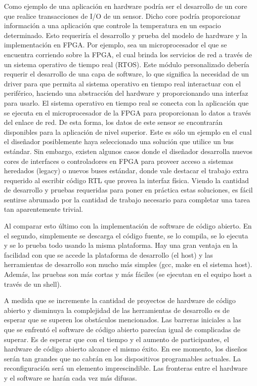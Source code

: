 Como ejemplo de una aplicación en hardware podría ser el desarrollo de
un core que realice transacciones de I/O de un sensor. Dicho core
podría proporcionar información a una aplicación que controle la
temperatura en un espacio determinado. Esto requeriría el desarrollo y
prueba del modelo de hardware y la implementación en FPGA. Por
ejemplo, sea un microprocesador el que se encuentra corriendo sobre la
FPGA, el cual brinda los servicios de red a través de un sistema
operativo de tiempo real (RTOS). Este módulo personalizado debería
requerir el desarrollo de una capa de software, lo que significa la
necesidad de un driver para que permita al sistema operativo en tiempo
real interactuar con el periférico, haciendo una abstracción del
hardware y proporcionando una interfaz para usarlo. El sistema
operativo en tiempo real se conecta con la aplicación que se ejecuta
en el microprocesador de la FPGA para proporcionan lo datos a través
del enlace de red. De esta forma, los datos de este sensor se
encontrarán disponibles para la aplicación de nivel superior. Este es
sólo un ejemplo en el cual el diseñador posiblemente haya seleccionado
una solución que utilice un bus estándar. Sin embargo, existen algunos
casos donde el diseñador desarrolla nuevos cores de interfaces o
controladores en FPGA para proveer acceso a sistemas heredados
(legacy) o nuevos buses estándar, donde vale destacar el trabajo extra
requerido al escribir código RTL que provea la interfaz física. Viendo
la cantidad de desarrollo y pruebas requeridas para poner en práctica
estas soluciones, es fácil sentirse abrumado por la cantidad de
trabajo necesario para completar una tarea tan aparentemente trivial.

Al comparar esto último con la implementación de software de código
abierto. En el segundo, simplemente se descarga el código fuente, se
lo compila, se lo ejecuta y se lo prueba todo usando la misma
plataforma. Hay una gran ventaja en la facilidad con que se accede la
plataforma de desarrollo (el host) y las herramientas de
desarrollo son mucho más simples (gcc, make en el sistema
host). Además, las pruebas son más cortas y más fáciles (se
ejecutan en el equipo host a través de un shell).


A medida que se incremente la cantidad de proyectos de hardware de código
abierto y disminuya la complejidad de las herramientas de desarrollo
es de esperar que se superen los obstáculos mencionados. Las barreras
iniciales a las que se enfrentó el software de código abierto parecían
igual de complicadas de superar. Es de esperar que con el tiempo y el
aumento de participantes, el hardware de código abierto alcance el
mismo éxito. En ese momento, los diseños serán tan grandes que no
cabrán en los dispositivos programables actuales. La reconfiguración
será un elemento imprescindible. Las fronteras entre el hardware y el
software se harán cada vez más difusas.

